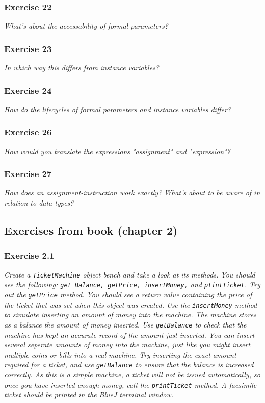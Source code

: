 \subsubsection*{Exercise 22}
\textit{What's about the accessability of formal parameters?}\\

\subsubsection*{Exercise 23}
\textit{In which way this differs from instance variables?}\\

\subsubsection*{Exercise 24}
\textit{How do the lifecycles of formal parameters and instance variables 
	differ?}\\

\subsubsection*{Exercise 26}
\textit{How would you translate the expressions "assignment" and 
	"expression"?}\\

\subsubsection*{Exercise 27}
\textit{How does an assignment-instruction work exactly? What's about to 
	be aware of in relation to data types?}\\

\subsection{Exercises from book (chapter 2)}
\subsubsection{Exercise 2.1}
\textit{Create a \verb?TicketMachine? object bench and take a look at its 
methods. You should see the following: 
\verb?get Balance, getPrice, insertMoney,? and \verb?ptintTicket?. Try out the 
\verb?getPrice? method. You should see a return value containing the price of 
the ticket thet was set when this object was created. Use the 
\verb?insertMoney? method to simulate inserting an amount of money into the 
machine. The machine stores as a balance the amount of money inserted. Use 
\verb?getBalance? to check that the machine has kept an accurate record of the 
amount just inserted. You can insert several seperate amounts of money into the 
machine, just like you might insert multiple coins or bills into a real 
machine. Try inserting the exact amount required for a ticket, and use 
\verb?getBalance? to ensure that the balance is increased correctly. As this 
is a simple machine, a ticket will not be issued automatically, so once you 
have inserted enough money, call the \verb?printTicket? method. A facsimile 
ticket should be printed in the BlueJ terminal window. }

